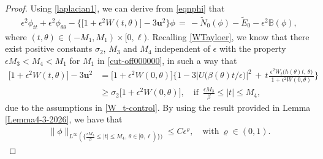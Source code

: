 \documentclass[10pt, reqno]{amsart}
\numberwithin{equation}{section}
\theoremstyle{definition}
\newcommand{\e}{\epsilon}
\def\p{\partial}
\begin{document}
{{\begin{proof}
\smallskip
 Using \eqref{laplacian1}, we can derive from \eqref{eqnphi} that
\begin{align} \label{odefortildephi}
\epsilon^2\phi_{tt} + \epsilon^2\phi_{\theta\theta} - \Big\{\big[1+ \epsilon^2 W (t, \theta) \big] - 3 {\mathbf u}^2\Big\}\phi
\,=\, - \tilde N_0(\phi) - \tilde E_0
 - \epsilon^2{\mathbb B}(\phi),
\end{align}
where $(t, \theta) \in (-M_1, M_1)\times [0, \ell)$.
Recalling \eqref{WTayloer},
we know that there exist positive constants $\sigma_2$, $M_3$ and $M_4$ independent of $\epsilon$ with the property $\e M_3< M_4<M_1$ for $M_1$ in \eqref{cut-off000000}, in such a way that
\begin{align*}
 \big[1+ \epsilon^2 W (t, \theta) \big] - 3 {\mathbf u}^2
 &=\big[1+ \epsilon^2 W(0, \theta) \big]
 \Bigg\{1 - 3 \big|U\big(\beta(\theta)t/\epsilon\big)\big|^2 \,+\, t \frac{\ \epsilon^2W_t\big(\hbar(\theta) t, \, \theta\big)\,}{1+ \epsilon^2 W(0, \theta)}
 \Bigg\}
 \\
 &\geq \sigma_2\big[1+ \epsilon^2 W(0, \theta) \big],
 \quad \text{if }\,  \frac {\e M_3} {\beta}\leq |t|\leq M_4,
\end{align*}
due to the assumptions in \eqref{W_t-control}.
\medskip
 By using  the result provided in Lemma \ref{Lemma4-3-2026}, we have that
\begin{align} \label{linftyepsilonphi}
 \|\phi \|_{L^\infty (\{\frac {\e M_3} {\beta}\leq |t|\leq M_4,\, \theta\in [0, \ell)\}) } \le C \e^{\varrho}, \quad \text{with}~\varrho\in (0, 1).
\end{align}

\end{proof}}}
\end{document}
